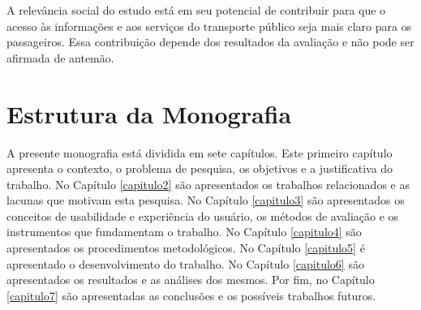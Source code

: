 A relevância social do estudo está em seu potencial de contribuir para que o acesso às informações e aos serviços do transporte público seja mais claro para os passageiros. Essa contribuição depende dos resultados da avaliação e não pode ser afirmada de antemão. 

\section{Estrutura da Monografia}

A presente monografia está dividida em sete capítulos. Este primeiro capítulo apresenta o contexto, o problema de pesquisa, os objetivos e a justificativa do trabalho. No Capítulo \ref{capitulo2} são apresentados os trabalhos relacionados e as lacunas que motivam esta pesquisa. No Capítulo \ref{capitulo3} são apresentados os conceitos de usabilidade e experiência do usuário, os métodos de avaliação e os instrumentos que fundamentam o trabalho. No Capítulo \ref{capitulo4} são apresentados os procedimentos metodológicos. No Capítulo \ref{capitulo5} é apresentado o desenvolvimento do trabalho. No Capítulo \ref{capitulo6} são apresentados os resultados e as análises dos mesmos. Por fim, no Capítulo \ref{capitulo7} são apresentadas as conclusões e os possíveis trabalhos futuros.
